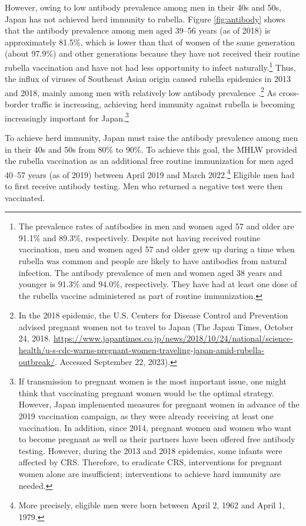 \documentclass[
]{article}
\begin{document}
However, owing to low antibody prevalence among men in their 40s and 50s, Japan has not achieved herd immunity to rubella. Figure \ref{fig:antibody} shows that the antibody prevalence among men aged 39--56 years (as of 2018) is approximately 81.5\%, which is lower than that of women of the same generation (about 97.9\%) and other generations because they have not received their routine rubella vaccination and have not had less opportunity to infect naturally.\footnote{The prevalence rates of antibodies in men and women aged 57 and older are 91.1\% and 89.3\%, respectively. Despite not having received routine vaccination, men and women aged 57 and older grew up during a time when rubella was common and people are likely to have antibodies from natural infection. The antibody prevalence of men and women aged 38 years and younger is 91.3\% and 94.0\%, respectively. They have had at least one dose of the rubella vaccine administered as part of routine immunization.} Thus, the influx of viruses of Southeast Asian origin caused rubella epidemics in 2013 and 2018, mainly among men with relatively low antibody prevalence \citep{NIID2019}.\footnote{In the 2018 epidemic, the U.S. Centers for Disease Control and Prevention advised pregnant women not to travel to Japan (The Japan Times, October 24, 2018. \url{https://www.japantimes.co.jp/news/2018/10/24/national/science-health/u-s-cdc-warns-pregnant-women-traveling-japan-amid-rubella-outbreak/}. Accessed September 22, 2023).} As cross-border traffic is increasing, achieving herd immunity against rubella is becoming increasingly important for Japan.\footnote{If transmission to pregnant women is the most important issue, one might think that vaccinating pregnant women would be the optimal strategy. However, Japan implemented measures for pregnant women in advance of the 2019 vaccination campaign, as they were already receiving at least one vaccination. In addition, since 2014, pregnant women and women who want to become pregnant as well as their partners have been offered free antibody testing. However, during the 2013 and 2018 epidemics, some infants were affected by CRS. Therefore, to eradicate CRS, interventions for pregnant women alone are insufficient; interventions to achieve hard immunity are needed.}

To achieve herd immunity, Japan must raise the antibody prevalence among men in their 40s and 50s from 80\% to 90\%. To achieve this goal, the MHLW provided the rubella vaccination as an additional free routine immunization for men aged 40--57 years (as of 2019) between April 2019 and March 2022.\footnote{More precisely, eligible men were born between April 2, 1962 and April 1, 1979.} Eligible men had to first receive antibody testing. Men who returned a negative test were then vaccinated.
\end{document}
